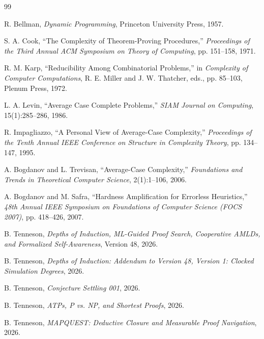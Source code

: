 \documentclass[11pt]{article}
\theoremstyle{definition}
\begin{document}
\begin{thebibliography}{99}

R. Bellman,
\emph{Dynamic Programming},
Princeton University Press, 1957.

S. A. Cook,
``The Complexity of Theorem-Proving Procedures,''
\emph{Proceedings of the Third Annual ACM Symposium on Theory of Computing},
pp. 151--158, 1971.

R. M. Karp,
``Reducibility Among Combinatorial Problems,''
in \emph{Complexity of Computer Computations},
R. E. Miller and J. W. Thatcher, eds., pp. 85--103, Plenum Press, 1972.

L. A. Levin,
``Average Case Complete Problems,''
\emph{SIAM Journal on Computing}, 15(1):285--286, 1986.

R. Impagliazzo,
``A Personal View of Average-Case Complexity,''
\emph{Proceedings of the Tenth Annual IEEE Conference on Structure in Complexity Theory},
pp. 134--147, 1995.

A. Bogdanov and L. Trevisan,
``Average-Case Complexity,''
\emph{Foundations and Trends in Theoretical Computer Science},
2(1):1--106, 2006.

A. Bogdanov and M. Safra,
``Hardness Amplification for Errorless Heuristics,''
\emph{48th Annual IEEE Symposium on Foundations of Computer Science (FOCS 2007)},
pp. 418--426, 2007.

B. Tenneson,
\emph{Depths of Induction, ML-Guided Proof Search, Cooperative AMLDs, and Formalized Self-Awareness},
Version 48, 2026.

B. Tenneson,
\emph{Depths of Induction: Addendum to Version 48, Version 1: Clocked Simulation Degrees},
2026.

B. Tenneson,
\emph{Conjecture Settling 001},
2026.

B. Tenneson,
\emph{ATPs, P vs. NP, and Shortest Proofs},
2026.

B. Tenneson,
\emph{MAPQUEST: Deductive Closure and Measurable Proof Navigation},
2026.

\end{thebibliography}
\end{document}

